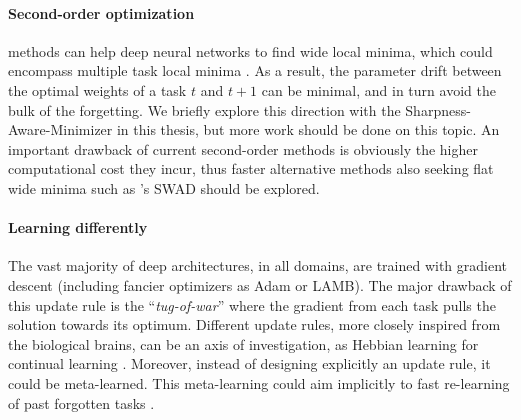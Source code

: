 \paragraph{Second-order optimization} methods can help deep neural networks to find wide local
minima, which could encompass multiple task local minima \citep{lee2020kroneckercontinual}. As a
result, the parameter drift between the optimal weights of a task $t$ and $t+1$ can be minimal, and
in turn avoid the bulk of the forgetting. We briefly explore this direction with the
Sharpness-Aware-Minimizer \citep{foret2020sam} in this thesis, but more work should be done on this
topic. An important drawback of current second-order methods is obviously the higher computational
cost they incur, thus faster alternative methods also seeking flat wide minima such as
\citet{cha2021swad}'s SWAD should be explored.

\paragraph{Learning differently} The vast majority of deep architectures, in all domains, are
trained with gradient descent (including fancier optimizers as Adam or LAMB). The major drawback of
this update rule is the ``\textit{tug-of-war}'' \citep{hadsell2020embracingchange} where the
gradient from each task pulls the solution towards its optimum. Different update rules, more closely
inspired from the biological brains, can be an axis of investigation, as Hebbian learning for
continual learning \citep{taylor2020hebbiancontinual}. Moreover, instead of designing explicitly an
update rule, it could be meta-learned. This meta-learning could aim implicitly to fast re-learning
of past forgotten tasks \citep{he2019metacontinual,caccia2020osaka}.


